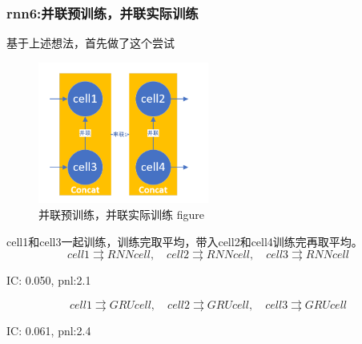 \documentclass[11pt]{ctexart}
\begin{document}
\subsubsection{rnn6:并联预训练，并联实际训练}
基于上述想法，首先做了这个尝试
\begin{figure}[H]
\begin{center}
\includegraphics[width=0.5\textwidth]{rnn6.PNG}
\end{center}
\caption{并联预训练，并联实际训练 figure}
\label{FIG.25}
\end{figure}
cell1和cell3一起训练，训练完取平均，带入cell2和cell4训练完再取平均。
$$cell1 \rightrightarrows RNNcell, \quad cell2 \rightrightarrows RNNcell, \quad cell3 \rightrightarrows RNNcell$$

{\kaishu \small IC: 0.050, pnl:2.1}

$$cell1 \rightrightarrows GRUcell, \quad cell2 \rightrightarrows GRUcell, \quad cell3 \rightrightarrows GRUcell$$

{\kaishu \small IC: 0.061, pnl:2.4}
\end{document}
